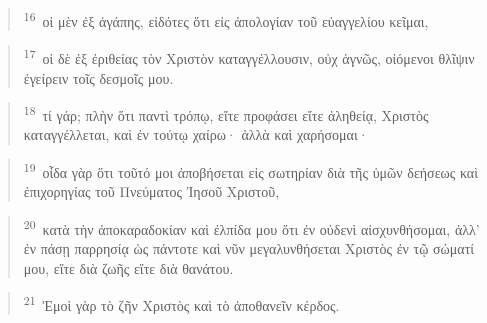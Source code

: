 \documentclass{article}
\newcommand{\currentverse}{1} %
\newcommand{\setcurrentverse}[1]{\renewcommand{\currentverse}{#1}}
\begin{document}
\begin{verse}

\setcurrentverse{16}

\setcounter{footnote}{0}

\textsuperscript{16}~οἱ μὲν ἐξ ἀγάπης, εἰδότες ὅτι εἰς ἀπολογίαν τοῦ εὐαγγελίου κεῖμαι,

\end{verse}

\begin{verse}

\setcurrentverse{17}

\setcounter{footnote}{0}

\textsuperscript{17}~οἱ δὲ ἐξ ἐριθείας τὸν Χριστὸν καταγγέλλουσιν, οὐχ ἁγνῶς, οἰόμενοι θλῖψιν ἐγείρειν τοῖς δεσμοῖς μου.

\end{verse}

\begin{verse}

\setcurrentverse{18}

\setcounter{footnote}{0}

\textsuperscript{18}~τί γάρ; πλὴν ὅτι παντὶ τρόπῳ, εἴτε προφάσει εἴτε ἀληθείᾳ, Χριστὸς καταγγέλλεται, καὶ ἐν τούτῳ χαίρω· ἀλλὰ καὶ χαρήσομαι·

\end{verse}

\begin{verse}

\setcurrentverse{19}

\setcounter{footnote}{0}

\textsuperscript{19}~οἶδα γὰρ ὅτι τοῦτό μοι ἀποβήσεται εἰς σωτηρίαν διὰ τῆς ὑμῶν δεήσεως καὶ ἐπιχορηγίας τοῦ Πνεύματος Ἰησοῦ Χριστοῦ,

\end{verse}

\begin{verse}

\setcurrentverse{20}

\setcounter{footnote}{0}

\textsuperscript{20}~κατὰ τὴν ἀποκαραδοκίαν καὶ ἐλπίδα μου ὅτι ἐν οὐδενὶ αἰσχυνθήσομαι, ἀλλ’ ἐν πάσῃ παρρησίᾳ ὡς πάντοτε καὶ νῦν μεγαλυνθήσεται Χριστὸς ἐν τῷ σώματί μου, εἴτε διὰ ζωῆς εἴτε διὰ θανάτου.

\end{verse}

\begin{verse}

\setcurrentverse{21}

\setcounter{footnote}{0}

\textsuperscript{21}~Ἐμοὶ γὰρ τὸ ζῆν Χριστὸς καὶ τὸ ἀποθανεῖν κέρδος.

\end{verse}
\end{document}
